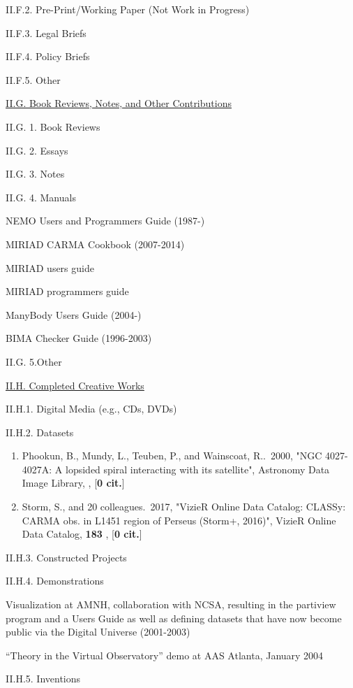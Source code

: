 \documentclass[11pt,letterpaper]{article}
\begin{document}
II.F.2. Pre-Print/Working Paper (Not Work in Progress)

II.F.3. Legal Briefs

II.F.4. Policy Briefs

II.F.5. Other


\underline{II.G. Book Reviews, Notes, and Other Contributions}

II.G. 1. Book Reviews


II.G. 2. Essays

II.G. 3. Notes

II.G. 4. Manuals

NEMO Users and Programmers Guide (1987-)

MIRIAD CARMA Cookbook (2007-2014)

MIRIAD users guide

MIRIAD programmers guide

ManyBody Users Guide (2004-)

BIMA Checker Guide (1996-2003)


II.G. 5.Other


\underline{II.H. Completed Creative Works}

II.H.1. Digital Media (e.g., CDs, DVDs)

II.H.2. Datasets

\begin{enumerate}[resume,label=\textbf{\arabic*}.]
\item  
Phookun, B., Mundy, L., Teuben, P., and Wainscoat, R..\  2000,  "NGC 
4027-4027A: A lopsided spiral interacting with its satellite", Astronomy 
Data Image Library,  ,  [{\bf 0 cit.}] 

\item  
Storm, S., and 20 colleagues.\  2017,  "VizieR Online Data Catalog: CLASSy: 
CARMA obs. in L1451 region of Perseus (Storm+, 2016)", VizieR Online Data 
Catalog,  {\bf 183} ,  [{\bf 0 cit.}] 
\end{enumerate}

II.H.3. Constructed Projects

II.H.4. Demonstrations

Visualization at AMNH, collaboration with NCSA, resulting in the
partiview program and a Users Guide as well as defining datasets that
have now become public via the Digital Universe (2001-2003)

``Theory in the Virtual Observatory'' demo at AAS  Atlanta, January 2004
                
II.H.5. Inventions
\end{document}
